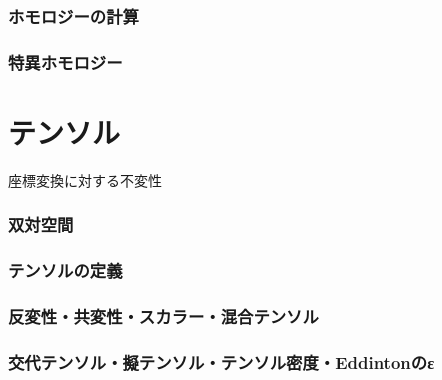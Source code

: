 \documentclass[uplatex]{jsarticle}
\newcommand{\octopuspart}[1]{\newpage\part{#1}\setcounter{section}{0}\vspace{3\baselineskip}}
\begin{document}
\section{ホモロジーの計算}
\section{特異ホモロジー}

\octopuspart{テンソル}
座標変換に対する不変性

\section{双対空間}
\section{テンソルの定義}
\section{反変性・共変性・スカラー・混合テンソル}
\section{交代テンソル・擬テンソル・テンソル密度・Eddintonのε}
\end{document}
